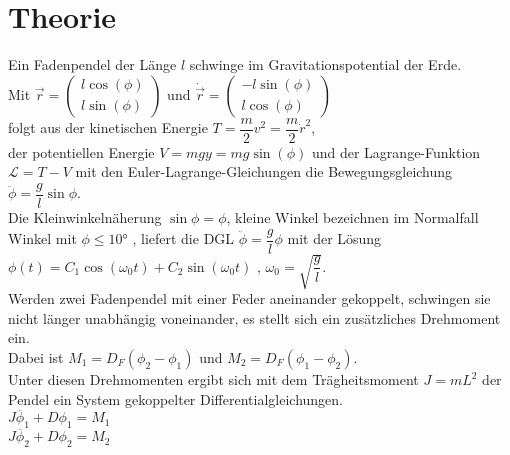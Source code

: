 \section{Theorie}
\label{sec:Theorie}
Ein Fadenpendel der Länge $l$ schwinge im Gravitationspotential der Erde. \\ 

\noindent Mit $\vec{r} = \left(\begin{array}{c} l \cos(\phi) \\ l \sin(\phi) \end{array} \right)$ und $\dot{\vec{r}} =\left(\begin{array}{c} -l \sin(\phi) \\ l \cos(\phi) \end{array} \right)$ \\

\noindent folgt aus der kinetischen Energie $T = \dfrac{m}{2} v^2 = \dfrac{m}{2} \dot{r}^2$, \\
der potentiellen Energie $V = mgy = mg\sin(\phi)$ und der Lagrange-Funktion $\mathscr{L} = T - V$ mit den Euler-Lagrange-Gleichungen die Bewegungsgleichung \\

\noindent $\ddot{\phi} = \dfrac{g}{l}\sin{\phi}$. \\

Die Kleinwinkelnäherung $\sin{\phi}=\phi$, kleine Winkel bezeichnen im Normalfall Winkel mit $\phi \leq 10°$ \cite{wiki:xxx}, liefert die DGL $\ddot{\phi} = \dfrac{g}{l}\phi$ mit der Lösung \\ 
$\phi(t) = C_1 \cos(\omega_0t) + C_2 \sin(\omega_0t)$ , $\omega_0=\sqrt{\dfrac{g}{l}}$. \\

Werden zwei Fadenpendel mit einer Feder aneinander gekoppelt, schwingen sie nicht länger unabhängig voneinander, es stellt sich ein zusätzliches Drehmoment ein. \\

\noindent Dabei ist $M_1=D_F(\phi_2-\phi_1)$ und $M_2=D_F(\phi_1-\phi_2)$. \\

Unter diesen Drehmomenten ergibt sich mit dem Trägheitsmoment $J=mL^2$ der Pendel ein System gekoppelter Differentialgleichungen. \\

\noindent $J\ddot{\phi_1} + D\phi_1 = M_1$ \\

\noindent $J\ddot{\phi_2} + D\phi_2 = M_2$ \\

